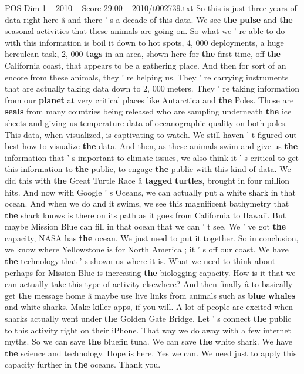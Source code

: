 \begin{textsample}{POS Dim 1 – 2010 – Score 29.00 – 2010/t002739.txt}
So this is just three years of data right here â and there ' s a decade of this data.
We see \textbf{the} \textbf{pulse} and \textbf{the} seasonal activities that these animals are going on.
So what we ' re able to do with this information is boil it down to hot spots, 4, 000 deployments, a huge herculean task, 2, 000 \textbf{tags} in an area, shown here for \textbf{the} first time, off \textbf{the} California coast, that appears to be a gathering place.
And then for sort of an encore from these animals, they ' re helping us.
They ' re carrying instruments that are actually taking data down to 2, 000 meters.
They ' re taking information from our \textbf{planet} at very critical places like Antarctica and \textbf{the} Poles.
Those are \textbf{seals} from many countries being released who are sampling underneath \textbf{the} ice sheets and giving us temperature data of oceanographic quality on both poles.
This data, when visualized, is captivating to watch.
We still haven ' t figured out best how to visualize \textbf{the} data.
And then, as these animals swim and give us \textbf{the} information that ' s important to climate issues, we also think it ' s critical to get this information to \textbf{the} public, to engage \textbf{the} public with this kind of data.
We did this with \textbf{the} Great Turtle Race â \textbf{tagged} \textbf{turtles}, brought in four million hits.
And now with Google ' s Oceans, we can actually put a white shark in that ocean.
And when we do and it swims, we see this magnificent bathymetry that \textbf{the} shark knows is there on its path as it goes from California to Hawaii.
But maybe Mission Blue can fill in that ocean that we can ' t see.
We ' ve got \textbf{the} capacity, NASA has \textbf{the} ocean.
We just need to put it together.
So in conclusion, we know where Yellowstone is for North America ; it ' s off our coast.
We have \textbf{the} technology that ' s shown us where it is.
What we need to think about perhaps for Mission Blue is increasing \textbf{the} biologging capacity.
How is it that we can actually take this type of activity elsewhere?
And then finally â to basically get \textbf{the} message home â maybe use live links from animals such as \textbf{blue} \textbf{whales} and white sharks.
Make killer apps, if you will.
A lot of people are excited when sharks actually went under \textbf{the} Golden Gate Bridge.
Let ' s connect \textbf{the} public to this activity right on their iPhone.
That way we do away with a few internet myths.
So we can save \textbf{the} bluefin tuna.
We can save \textbf{the} white shark.
We have \textbf{the} science and technology.
Hope is here.
Yes we can.
We need just to apply this capacity further in \textbf{the} oceans.
Thank you.

\end{textsample}
